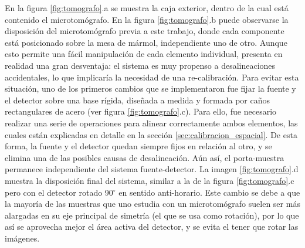 En la figura \ref{fig:tomografo}.a se muestra la caja exterior, dentro de la cual está
contenido el microtomógrafo. En la figura \ref{fig:tomografo}.b puede observarse la
disposición del microtomógrafo
previa a este trabajo, donde cada componente está posicionado sobre la mesa de mármol,
independiente uno de otro.
Aunque esto permite una fácil manipulación de cada elemento
individual, presenta en realidad una gran desventaja: el sistema es muy propenso a
desalineaciones accidentales, lo que implicaría la necesidad de una re-calibración. Para evitar esta
situación, uno de los primeros cambios que se implementaron fue fijar la fuente y
el detector sobre una base rígida, diseñada a medida y formada por caños rectangulares
de acero (ver figura \ref{fig:tomografo}.c). Para ello, fue necesario realizar
una serie de operaciones para alinear correctamente ambos elementos, las cuales están
explicadas en detalle en la sección \ref{sec:calibracion_espacial}. De esta forma, la fuente
y el detector quedan siempre fijos en relación al otro, y se elimina una de las posibles
causas de desalineación. Aún así, el porta-muestra permanece independiente del
sistema fuente-detector. La imagen \ref{fig:tomografo}.d muestra la disposición final del
sistema, similar a la de la figura \ref{fig:tomografo}.c pero con el detector rotado 90$^{\circ}$ en
sentido anti-horario. Este cambio se debe a que la mayoría de las muestras que uno estudia
con un microtomógrafo suelen ser más alargadas en su eje principal de simetría (el que se
usa como rotación), por lo que así se aprovecha mejor el área activa del detector, y se
evita el tener que rotar las imágenes.

